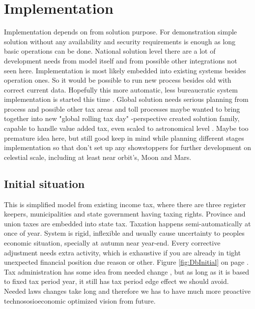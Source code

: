 %
%
%
\chapter{Implementation}
\label{implementation}

Implementation depends on from solution purpose.
For demonstration simple solution without any availability
and security requirements is enough as long basic operations can be done.
National solution level there are a lot of development needs from model itself
and from possible other integrations not seen here.
Implementation is most likely embedded into existing systems besides operation ones.
So it would be possible to run new process besides old with correct current data.
Hopefully this more automatic,
less bureaucratic system implementation is started this time
\cite{BasicIncomeInit}\-\cite{LiberaPerustili}\-\cite{A2PalkkaerotIlta}\-\cite{UniversalCredit}\-\cite{UniversalBasicIncome}.
Global solution needs serious planning from process and possible other tax areas
and toll processes maybe wanted to bring together into new
"global rolling tax day" -perspective created solution family,
capable to handle value added tax, even scaled to astronomical level \cite{LTEonMoon}.
Maybe too premature idea here,
but still good keep in mind while planning different stages implementation
so that don't set up any showstoppers for further development on celestial scale,
including at least near orbit's, Moon and Mars.

\section{Initial situation}
\label{db_initial_situation}
This is simplified model from existing income tax,
where there are three register keepers,
municipalities and state government having taxing rights.
Province and union taxes are embedded into state tax.
Taxation happens semi-automatically at once of year.
System is rigid, inflexible and usually cause uncertainty to peoples economic situation,
specially at autumn near year-end.
Every corrective adjustment needs extra activity,
which is exhaustive if you are already in tight unexpected financial position due reason or other.
Figure \ref{fig:DbInitial} on page \pageref{fig:DbInitial}.
Tax administration has some idea from needed change \cite{SemiAutomaticWitholdingRate},
but as long as it is based to fixed tax period year,
it still has tax period edge effect we should avoid.
Needed laws changes take long and therefore we has to have much more proactive
technososioeconomic optimized vision from future.

